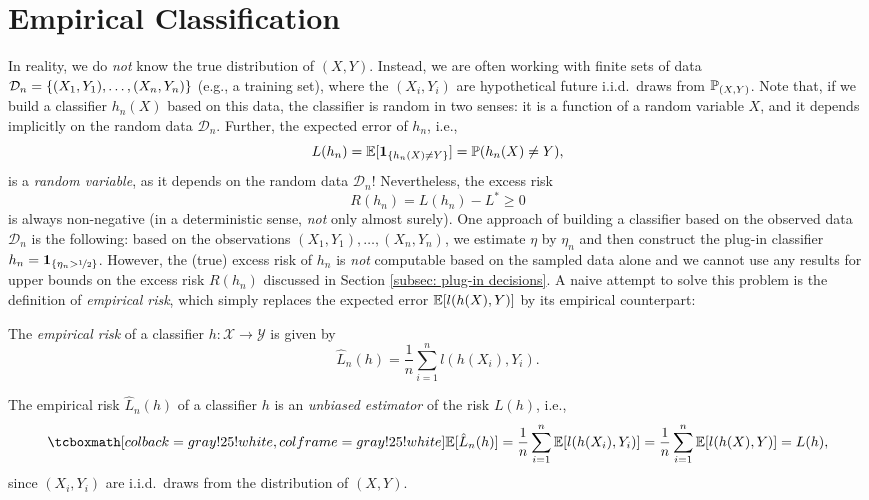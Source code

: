 \section{Empirical Classification}
\label{subsec: empirical classification}

In reality, we do \emph{not} know the true distribution of $(X, Y)$. Instead, we are often working with finite sets of data $\mathcal{D}_n = \set{(X_1, Y_1), \dots, (X_n, Y_n)}$ (e.g., a training set), where the $(X_i, Y_i)$ are hypothetical future i.i.d.\ draws from $\P_{(X, Y)}$. Note that, if we build a classifier $h_n(X)$ based on this data, the classifier is random in two senses: it is a function of a random variable $X$, and it depends implicitly on the random data $\mathcal{D}_n$. Further, the expected error of $h_n$, i.e.,
\[
    L(h_n) = \Exp[\indSet{h_n(X) \neq Y}] = \P(h_n(X) \neq Y),
\]
is a \emph{random variable}, as it depends on the random data $\mathcal{D}_n$! Nevertheless, the excess risk
\[
    R(h_n) = L(h_n) - L^* \geq 0
\]
is always non-negative (in a deterministic sense, \emph{not} only almost surely). One approach of building a classifier based on the observed data $\mathcal{D}_n$ is the following: based on the observations $(X_1, Y_1), \dots, (X_n, Y_n)$, we estimate $\eta$ by $\eta_n$ and then construct the plug-in classifier $h_n = \indSet{\eta_n > \nicefrac{1}{2}}$. However, the (true) excess risk of $h_n$ is \emph{not} computable based on the sampled data alone and we cannot use any results for upper bounds on the excess risk $R(h_n)$ discussed in Section \ref{subsec: plug-in decisions}. A naive attempt to solve this problem is the definition of \emph{empirical risk}, which simply replaces the expected error $\Exp[l(h(X), Y)]$ by its empirical counterpart:

\begin{definition}
The \emph{empirical risk} of a classifier $h \colon \mathcal{X} \to \mathcal{Y}$ is given by
\[
    \hat L_n(h) = \frac{1}{n} \sum_{i=1}^n l(h(X_i), Y_i).
\]
\end{definition}

The empirical risk $\hat L_n(h)$ of a classifier $h$ is an \emph{unbiased estimator} of the  risk $L(h)$, i.e.,
\begin{equation}
\label{eq: bias of empirical risk}
    \highlightMath{
        \Exp[\hat{L}_n(h)] = \frac{1}{n} \sum_{i=1}^n \Exp[l(h(X_i), Y_i)] = \frac{1}{n} \sum_{i=1}^n \Exp[l(h(X), Y)] = L(h),
    }
\end{equation}
since $(X_i, Y_i)$ are i.i.d.\ draws from the distribution of $(X, Y)$.

